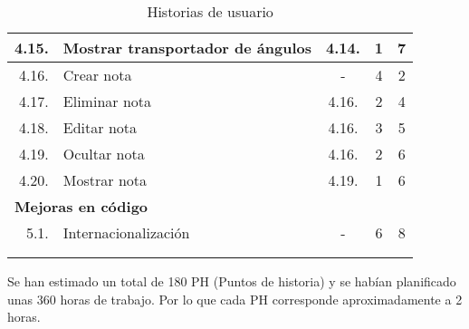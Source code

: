 \begin{longtable} {r l c c c}
	\hline
	4.15.	&	Mostrar transportador de ángulos	&	4.14.			&	1				&	7	\\
	\hline
	4.16.	&	Crear nota							&	-				&	4				&	2	\\
	\hline
	4.17.	&	Eliminar nota						&	4.16.			&	2				&	4	\\
	\hline
	4.18.	&	Editar nota							&	4.16.			&	3				&	5	\\
	\hline
	4.19.	&	Ocultar nota						&	4.16.			&	2				&	6	\\
	\hline
	4.20.	&	Mostrar nota						&	4.19.			&	1				&	6	\\
	\hline
	\multicolumn{5}{l}{\textbf{Mejoras en código}} \\
	\hline
	5.1.	&	Internacionalización				&	-				&	6				&	8	\\
	\hline
	\\
	\caption{Historias de usuario}
	\label{tab:analisis/hus}
\end{longtable}

Se han estimado un total de 180 PH (Puntos de historia) y se habían planificado unas 360 horas de trabajo. Por lo que cada PH corresponde aproximadamente a 2 horas.
